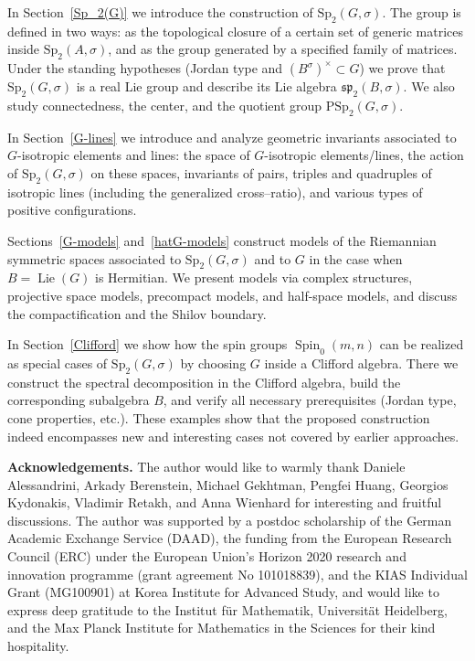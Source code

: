 \documentclass[a4paper,oneside,11pt]{amsart}
\DeclareMathOperator{\Lie}{Lie}
\theoremstyle{plain}
\theoremstyle{definition}
\theoremstyle{remark}
\begin{document}
In Section~\ref{Sp_2(G)} we introduce the construction of $\mathrm{Sp}_2(G,\sigma)$. The group is defined in two ways: as the topological closure of a certain set of generic matrices inside $\mathrm{Sp}_2(A,\sigma)$, and as the group generated by a specified family of matrices. Under the standing hypotheses (Jordan type and $(B^\sigma)^\times\subset G$) we prove that $\mathrm{Sp}_2(G,\sigma)$ is a real Lie group and describe its Lie algebra $\mathfrak{sp}_2(B,\sigma)$. We also study connectedness, the center, and the quotient group $\mathrm{PSp}_2(G,\sigma)$.

In Section~\ref{G-lines} we introduce and analyze geometric invariants associated to $G$-isotropic elements and lines: the space of $G$-isotropic elements/lines, the action of $\mathrm{Sp}_2(G,\sigma)$ on these spaces, invariants of pairs, triples and quadruples of isotropic lines (including the generalized cross--ratio), and various types of positive configurations.

Sections~\ref{G-models} and~\ref{hatG-models} construct models of the Riemannian symmetric spaces associated to $\mathrm{Sp}_2(G,\sigma)$ and to $G$ in the case when $B=\Lie(G)$ is Hermitian. We present models via complex structures, projective space models, precompact models, and half-space models, and discuss the compactification and the Shilov boundary.

In Section~\ref{Clifford} we show how the spin groups $\operatorname{Spin}_0(m,n)$ can be realized as special cases of $\mathrm{Sp}_2(G,\sigma)$ by choosing $G$ inside a Clifford algebra. There we construct the spectral decomposition in the Clifford algebra, build the corresponding subalgebra $B$, and verify all necessary prerequisites (Jordan type, cone properties, etc.). These examples show that the proposed construction indeed encompasses new and interesting cases not covered by earlier approaches.

\vspace{5mm}

\textbf{Acknowledgements.}
The author would like to warmly thank Daniele Alessandrini, Arkady Berenstein, Michael Gekhtman, Pengfei Huang, Georgios Kydonakis, Vladimir Retakh, and Anna Wienhard for interesting and fruitful discussions. The author was supported by a postdoc scholarship of the German Academic Exchange Service (DAAD), the funding from the European Research Council (ERC) under the European Union’s Horizon 2020 research and innovation programme (grant agreement No 101018839), and the KIAS Individual Grant (MG100901) at Korea Institute for Advanced Study, and would like to express deep gratitude to the Institut f\"ur Mathematik, Universit\"at Heidelberg, and the Max Planck Institute for Mathematics in the Sciences for their kind hospitality.
\end{document}
